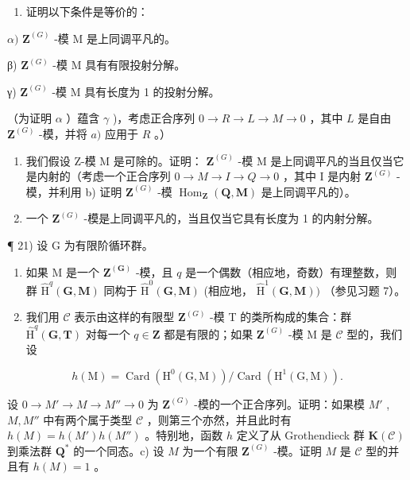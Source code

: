 \begin{enumerate}
\def\labelenumi{\alph{enumi})}
\setcounter{enumi}{1}
\tightlist
\item
  证明以下条件是等价的：
\end{enumerate}

\(\alpha)\) \(\mathbf{Z}^{(G)}\) -模 M 是上同调平凡的。

β) \(\mathbf{Z}^{(G)}\) -模 M 具有有限投射分解。

γ) \(\mathbf{Z}^{(G)}\) -模 M 具有长度为 1 的投射分解。

（为证明 \(\alpha\) ）蕴含 \(\gamma\) )，考虑正合序列 \(0 \to R \to L \to M \to 0\) ，其中 \(L\) 是自由 \(\mathbf{Z}^{(G)}\) -模，并将 \(a)\) 应用于 \(R\) 。）

\begin{enumerate}
\def\labelenumi{\alph{enumi})}
\setcounter{enumi}{2}
\item
  我们假设 Z-模 M 是可除的。证明： \(\mathbf{Z}^{(G)}\) -模 M 是上同调平凡的当且仅当它是内射的（考虑一个正合序列 \(0 \rightarrow M \rightarrow I \rightarrow Q \rightarrow 0\) ，其中 I 是内射 \(\mathbf{Z}^{(G)}\) -模，并利用 b) 证明 \(\mathbf{Z}^{(G)}\) -模 \(\operatorname{Hom}_{\mathbf{Z}}(\mathbf{Q}, \mathbf{M})\) 是上同调平凡的）。
\item
  一个 \(\mathbf{Z}^{(G)}\) -模是上同调平凡的，当且仅当它具有长度为 1 的内射分解。
\end{enumerate}

¶ 21) 设 G 为有限阶循环群。

\begin{enumerate}
\def\labelenumi{\alph{enumi})}
\item
  如果 M 是一个 \(\mathbf{Z}^{(\mathbf{G})}\) -模，且 \(q\) 是一个偶数（相应地，奇数）有理整数，则群 \(\hat{\mathrm{H}}^q (\mathbf{G},\mathbf{M})\) 同构于 \(\hat{\mathrm{H}}^0 (\mathbf{G},\mathbf{M})\) (相应地， \(\hat{\mathrm{H}}^1 (\mathbf{G},\mathbf{M}))\) （参见习题 7）。
\item
  我们用 \(\mathcal{C}\) 表示由这样的有限型 \(\mathbf{Z}^{(G)}\) -模 T 的类所构成的集合：群 \(\hat{\mathrm{H}}^q (\mathbf{G},\mathbf{T})\) 对每一个 \(q\in \mathbf{Z}\) 都是有限的；如果 \(\mathbf{Z}^{(G)}\) -模 M 是 \(\mathcal{C}\) 型的，我们设
\end{enumerate}

\[
h (\mathrm{M}) = \operatorname{Card} \left(\mathrm{H} ^ {0} (\mathrm{G}, \mathrm{M})\right) / \operatorname{Card} \left(\mathrm{H} ^ {1} (\mathrm{G}, \mathrm{M})\right).
\]

设 \(0 \to M' \to M \to M'' \to 0\) 为 \(\mathbf{Z}^{(G)}\) -模的一个正合序列。证明：如果模 \(M'\) , \(M, M''\) 中有两个属于类型 \(\mathcal{C}\) ，则第三个亦然，并且此时有 \(h(M) = h(M') h(M'')\) 。特别地，函数 \(h\) 定义了从 Grothendieck 群 \(\mathbf{K}(\mathcal{C})\) 到乘法群 \(\mathbf{Q}^*\) 的一个同态。c) 设 \(M\) 为一个有限 \(\mathbf{Z}^{(G)}\) -模。证明 \(M\) 是 \(\mathcal{C}\) 型的并且有 \(h(M) = 1\) 。

